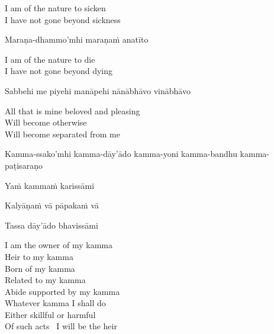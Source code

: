 \begin{english}
  I am of the nature to sicken\\
  I have not gone beyond sickness
\end{english}

Maraṇa-dhammo'mhi maraṇaṁ anatīto

\begin{english}
  I am of the nature to die\\
  I have not gone beyond dying
\end{english}

Sabbehi me piyehi manāpehi nānābhāvo vinābhāvo

\begin{english}
  All that is mine beloved and pleasing\\
  Will become otherwise\\
  Will become separated from me
\end{english}

\begin{pali-hang}
  Kamma-ssako'mhi kamma-dāy'ādo kamma-yoni kamma-bandhu kamma-paṭisaraṇo\\
\end{pali-hang}
\begin{pali-hangtogether}
  Yaṁ kammaṁ karissāmi\\
\end{pali-hangtogether}
\begin{pali-hangtogether}
  Kalyāṇaṁ vā pāpakaṁ vā\\
\end{pali-hangtogether}
\begin{pali-hangtogether}
  Tassa dāy'ādo bhavissāmi
\end{pali-hangtogether}

\begin{english-verses}
  I am the owner of my kamma\\
  Heir to my kamma\\
  Born of my kamma\\
  Related to my kamma\\
  Abide supported by my kamma\\
  Whatever kamma I shall do\\
  Either skillful or harmful\\
  Of such acts \breathmark\ I will be the heir\makeatletter\hyperlink{endnote98-appendix}\makeatother
\end{english-verses}

